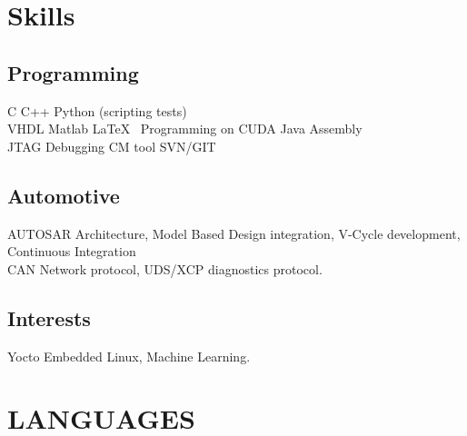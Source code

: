 \documentclass[]{deedy-resume-openfont}
\begin{document}
\begin{minipage}[t]{0.66\textwidth}

\section{Skills}
\subsection{Programming}
C \textbullet{}   C++ \textbullet{} Python (scripting tests) \\ 
VHDL \textbullet{}  Matlab  \textbullet{} \LaTeX\ \textbullet{} Programming on CUDA \textbullet{} Java \textbullet{} Assembly \\
JTAG Debugging \textbullet{} CM tool SVN/GIT 
\sectionsep

\subsection{Automotive}
AUTOSAR Architecture, Model Based Design integration, V-Cycle development, Continuous Integration \\ 
CAN Network protocol, UDS/XCP diagnostics protocol.
\sectionsep

\subsection{Interests}
Yocto Embedded Linux, Machine Learning.
\sectionsep

\section{LANGUAGES}
\sectionsep

\end{minipage} 
\end{document}

